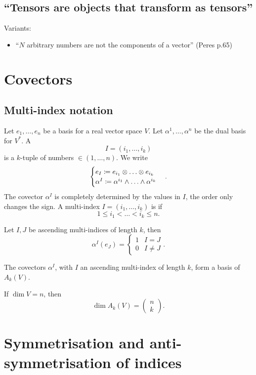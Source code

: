 \subsection{``Tensors are objects that transform as tensors''}
Variants:
\begin{itemize}
\item ``$N$ arbitrary numbers are not the components of a vector'' (Peres p.65)
\end{itemize}


\section{Covectors}

\subsection{Multi-index notation}
Let $e_1,\ldots, e_n$ be a basis for a real vector space $V$. Let $\alpha^1,\ldots, \alpha^n$ be the dual basis for $V^*$. A 
\[ I = (i_1,\ldots,i_k)\]
is a $k$-tuple of numbers $\in (1,\ldots,n)$. We write
\[ \begin{cases}
e_I \coloneqq e_{i_1}\otimes\ldots\otimes e_{i_k}\\
\alpha^I \coloneqq \alpha^{i_1}\wedge\ldots \wedge\alpha^{i_k}
\end{cases}. \]
The covector $\alpha^I$ is completely determined by the values in $I$, the order only changes the sign. A multi-index $I = (i_1,\ldots,i_k)$ is  if
\[ 1\leq i_1<\ldots<i_k\leq n. \]
\begin{proposition}
Let $I,J$ be ascending multi-indices of length $k$, then
\[ \alpha^I(e_J) = \begin{cases}
1 & I=J \\ 0& I\neq J
\end{cases}. \]
\end{proposition}
\begin{proposition}
The covectors $\alpha^I$, with $I$ an ascending multi-index of length $k$, form a basis of $A_k(V)$.
\end{proposition}
\begin{corollary}
If $\dim V=n$, then
\[ \dim A_k(V) = \begin{pmatrix}
n\\k
\end{pmatrix}. \]
\end{corollary}

\section{Symmetrisation and anti-symmetrisation of indices}

